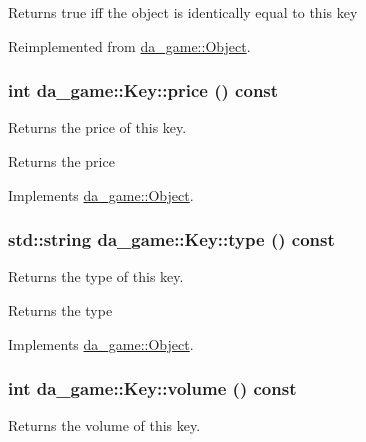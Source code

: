 \begin{DoxyReturn}{Returns}
true iff the object is identically equal to this key 
\end{DoxyReturn}


Reimplemented from \hyperlink{classda__game_1_1Object}{da\_\-game::Object}.\hypertarget{classda__game_1_1Key_af9752b65636483258a50e7ae553d131a}{
\subsubsection[{price}]{\setlength{\rightskip}{0pt plus 5cm}int da\_\-game::Key::price () const}}
\label{classda__game_1_1Key_af9752b65636483258a50e7ae553d131a}
Returns the price of this key.

\begin{DoxyReturn}{Returns}
the price 
\end{DoxyReturn}


Implements \hyperlink{classda__game_1_1Object}{da\_\-game::Object}.\hypertarget{classda__game_1_1Key_adaecf6030e14cd4da5142e8c760c5741}{
\subsubsection[{type}]{\setlength{\rightskip}{0pt plus 5cm}std::string da\_\-game::Key::type () const}}
\label{classda__game_1_1Key_adaecf6030e14cd4da5142e8c760c5741}
Returns the type of this key.

\begin{DoxyReturn}{Returns}
the type 
\end{DoxyReturn}


Implements \hyperlink{classda__game_1_1Object}{da\_\-game::Object}.\hypertarget{classda__game_1_1Key_ac21b171678f19465b41796007896dc84}{
\subsubsection[{volume}]{\setlength{\rightskip}{0pt plus 5cm}int da\_\-game::Key::volume () const}}
\label{classda__game_1_1Key_ac21b171678f19465b41796007896dc84}
Returns the volume of this key.

